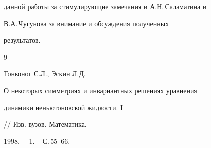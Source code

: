 данной работы за стимулирующие замечания и А.Н.\,Саламатина и


В.А.\,Чугунова за внимание и обсуждения полученных


результатов.





\begin{thebibliography}{9}







Тонконог С.Л., Эскин Л.Д. {\em


О некоторых симметриях и инвариантных решениях уравнения


динамики неньютоновской жидкости. I} // Изв. вузов. Математика. --


1998. -- \No\,1. -- С.\,55--66.








\end{thebibliography}





\vskip 2cm











\label{end}








